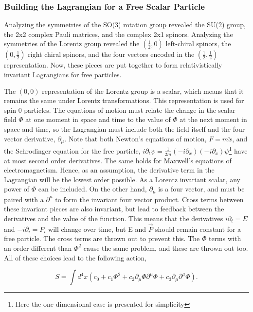 \subsubsection{Building the Lagrangian for a Free Scalar Particle}

Analyzing the symmetries of the SO(3) rotation group revealed the SU(2) group, the 2x2 complex Pauli matrices, and the complex 2x1 spinors. Analyzing the symmetries of the Lorentz group revealed the $(\frac{1}{2}, 0)$ left-chiral spinors, the $(0, \frac{1}{2})$ right chiral spinors, and the four vectors encoded in the $(\frac{1}{2}, \frac{1}{2})$ representation. Now, these pieces are put together to form relativistically invariant Lagrangians for free particles.  

The $(0,0)$ representation of the Lorentz group is a scalar, which means that it remains the same under Lorentz transformations. This representation is used for spin 0 particles. The equations of motion must relate the change in the scalar field $\Phi$ at one moment in space and time to the value of $\Phi$ at the next moment in space and time, so the Lagrangian must include both the field itself and the four vector derivative, $\partial_\mu$. Note that both Newton's equations of motion, $F=m\ddot{x}$, and the Schrodinger equation for the free particle, $i\partial_t\psi = \frac{1}{2m}(-i\partial_x)(-i\partial_x)\psi$\footnote{Here the one dimensional case is presented for simplicity} have at most second order derivatives. The same holds for Maxwell's equations of electromagnetism. Hence, as an assumption, the derivative term in the Lagrangian will be the lowest order possible. As a Lorentz invariant scalar, any power of $\Phi$ can be included. On the other hand, $\partial_\mu$ is a four vector, and must be paired with a $\partial^\mu$ to form the invariant four vector product. Cross terms between these invariant pieces are also invariant, but lead to feedback between the derivatives and the value of the function. This means that the derivatives $i\partial_t = E$ and $-i\partial_i = P_i$ will change over time, but E and $\vec{P}$ should remain constant for a free particle. The cross terms are thrown out to prevent this. The $\Phi$ terms with an order different than $\Phi^2$ cause the same problem, and these are thrown out too. All of these choices lead to the following action, 

\begin{equation}
S = \int d^4x \left(c_0 + c_1 \Phi^2  
+ c_2 \partial_\mu\Phi\partial^\mu\Phi + c_3 \partial_\mu \partial^\mu \Phi\right).
\end{equation}

